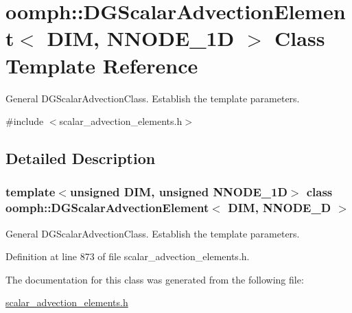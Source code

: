 \hypertarget{classoomph_1_1DGScalarAdvectionElement}{}\section{oomph\+:\+:D\+G\+Scalar\+Advection\+Element$<$ D\+IM, N\+N\+O\+D\+E\+\_\+1D $>$ Class Template Reference}
\label{classoomph_1_1DGScalarAdvectionElement}


General D\+G\+Scalar\+Advection\+Class. Establish the template parameters.  




{\ttfamily \#include $<$scalar\+\_\+advection\+\_\+elements.\+h$>$}



\subsection{Detailed Description}
\subsubsection*{template$<$unsigned D\+IM, unsigned N\+N\+O\+D\+E\+\_\+1D$>$\newline
class oomph\+::\+D\+G\+Scalar\+Advection\+Element$<$ D\+I\+M, N\+N\+O\+D\+E\+\_\+D $>$}

General D\+G\+Scalar\+Advection\+Class. Establish the template parameters. 

Definition at line 873 of file scalar\+\_\+advection\+\_\+elements.\+h.



The documentation for this class was generated from the following file\+:\begin{DoxyCompactItemize}
\item 
\hyperlink{scalar__advection__elements_8h}{scalar\+\_\+advection\+\_\+elements.\+h}\end{DoxyCompactItemize}
